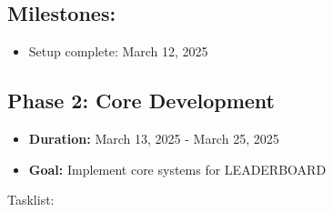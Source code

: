 \documentclass{report}
\begin{document}
\subsection*{Milestones:}
\begin{itemize}
    \item Setup complete: March 12, 2025
\end{itemize}
\subsection*{Phase 2: Core Development}
\begin{itemize}
    \item \textbf{Duration:} March 13, 2025 - March 25, 2025
    \item \textbf{Goal:} Implement core systems for LEADERBOARD
\end{itemize}
Tasklist:
\end{document}
